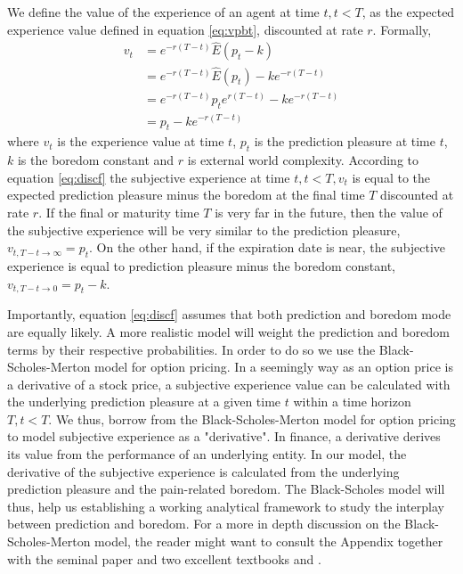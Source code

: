 \documentclass[11pt, onecolumn]{article}
\begin{document}
We define the value of the experience of an agent at time $t, t < T$, as the  expected experience value defined in equation \ref{eq:vpbt}, discounted at rate $r$. Formally,
\begin{equation}
\begin{split}
    v_t  & =  e^{-r(T-t)}\hat{E}(p_{t} - k)  \\
       & = e^{-r(T-t)}\hat{E}(p_{t}) - k e^{-r(T-t)} \\
       & = e^{-r(T-t)}p_{t} e^{r(T-t)}  - k e^{-r(T-t)} \\ 
        & = p_{t}  - k e^{-r(T-t)} 
\end{split}
\label{eq:discf}
\end{equation}
where $v_t$ is the experience value at time $t$, $p_{t}$ is the prediction pleasure at time $t$, $k$ is the boredom constant and $r$ is external world complexity.   
According to equation \ref{eq:discf} the subjective experience at time $t, t < T, v_t$ is equal to the expected prediction pleasure minus the boredom at the final time $T$ discounted at rate $r$. 
If the final or maturity time $T$ is very far in the future, then the value of the subjective experience will be very similar to the prediction pleasure, $ v_{t,T -t \to \infty} =  p_{t}$. On the other hand, if the expiration date is near, the subjective experience is equal to prediction pleasure minus the boredom constant, $ v_{t,T-t \to 0} =  p_{t} - k $.

Importantly, equation \ref{eq:discf} assumes that both prediction and boredom mode are equally likely. A more realistic model will weight the prediction and boredom terms by their respective probabilities. In order to do so we use the Black-Scholes-Merton model for option pricing. 
In a seemingly way as an option price is a derivative of a stock price, a subjective experience value can be calculated with the underlying prediction pleasure at a given time $t$ within a time horizon $T, t < T$. 
We thus, borrow from the Black-Scholes-Merton model for option pricing  \citep{black_pricing_1973} to model subjective experience as a "derivative". In finance, a derivative derives its value from the performance of an underlying entity. In our model, the derivative of the subjective experience is calculated from the underlying prediction pleasure and the pain-related boredom.
The Black-Scholes model will thus, help us establishing a working analytical framework to study the interplay between prediction and boredom. For a more in depth discussion on the Black-Scholes-Merton model, the reader might want to consult the Appendix together with the seminal paper \citep{black_pricing_1973} and two excellent textbooks \citep{hull_options_2005} and \citep{duffie_dynamic_2001}.
\end{document}
